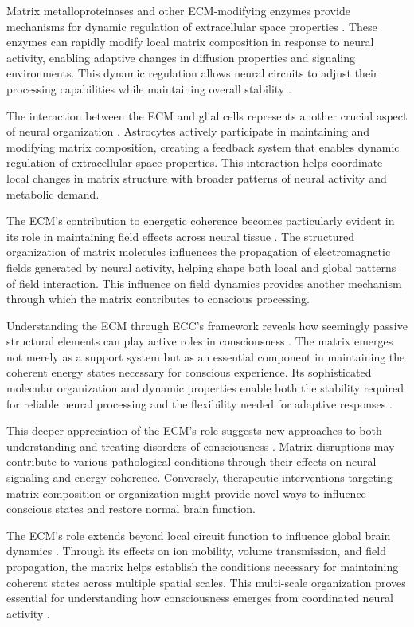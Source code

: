 \begin{refsection}
Matrix metalloproteinases and other ECM-modifying enzymes provide mechanisms for dynamic regulation of extracellular space properties \cite{Dityatev2003}. These enzymes can rapidly modify local matrix composition in response to neural activity, enabling adaptive changes in diffusion properties and signaling environments. This dynamic regulation allows neural circuits to adjust their processing capabilities while maintaining overall stability \cite{Song2018}.

The interaction between the ECM and glial cells represents another crucial aspect of neural organization \cite{Vargova2014}. Astrocytes actively participate in maintaining and modifying matrix composition, creating a feedback system that enables dynamic regulation of extracellular space properties. This interaction helps coordinate local changes in matrix structure with broader patterns of neural activity and metabolic demand.

The ECM's contribution to energetic coherence becomes particularly evident in its role in maintaining field effects across neural tissue \cite{Sykova2008}. The structured organization of matrix molecules influences the propagation of electromagnetic fields generated by neural activity, helping shape both local and global patterns of field interaction. This influence on field dynamics provides another mechanism through which the matrix contributes to conscious processing.

Understanding the ECM through ECC's framework reveals how seemingly passive structural elements can play active roles in consciousness \cite{Dityatev2010}. The matrix emerges not merely as a support system but as an essential component in maintaining the coherent energy states necessary for conscious experience. Its sophisticated molecular organization and dynamic properties enable both the stability required for reliable neural processing and the flexibility needed for adaptive responses \cite{Frischknecht2012}.

This deeper appreciation of the ECM's role suggests new approaches to both understanding and treating disorders of consciousness \cite{Burnside2014}. Matrix disruptions may contribute to various pathological conditions through their effects on neural signaling and energy coherence. Conversely, therapeutic interventions targeting matrix composition or organization might provide novel ways to influence conscious states and restore normal brain function.

The ECM's role extends beyond local circuit function to influence global brain dynamics \cite{Barros2011}. Through its effects on ion mobility, volume transmission, and field propagation, the matrix helps establish the conditions necessary for maintaining coherent states across multiple spatial scales. This multi-scale organization proves essential for understanding how consciousness emerges from coordinated neural activity \cite{Zimmermann2008}.


\end{refsection}
